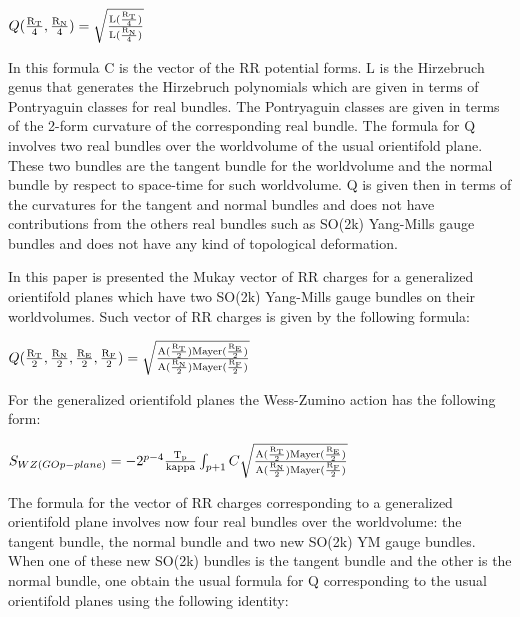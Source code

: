 \documentclass[a4paper,a4paper]{article}
\begin{document}
\begin{center}
{  $ Q(\frac{\rm R_T}{\rm 4},\frac{\rm R_N}{\rm 4}) =\sqrt{\frac{\rm L(\frac{\rm R_T}{\rm 4})}{\rm L(\frac{\rm R_N}{\rm 4})}}  $ }
\end{center}
In this formula C is the vector of the RR potential forms. L is the Hirzebruch genus that generates the Hirzebruch polynomials which are given in
terms of Pontryaguin classes for real bundles. The Pontryaguin classes are given in terms of the 2-form curvature of the corresponding real bundle. The
formula for Q involves two real bundles over the worldvolume of the usual orientifold plane.  These two bundles are the tangent bundle for the worldvolume and the normal bundle by respect to space-time for such worldvolume. Q is given then in terms of the curvatures for the tangent and
normal bundles and does not have contributions  from the others real bundles
such as SO(2k) Yang-Mills gauge bundles and does not have any kind of topological deformation.

In this paper is presented the Mukay vector of RR charges for a generalized
orientifold planes which have two SO(2k) Yang-Mills gauge bundles on their worldvolumes.  Such vector of RR charges is given by the following formula:

\begin{center}
{  $ Q(\frac{\rm R_T}{\rm 2},\frac{\rm R_N}{\rm 2},\frac{\rm R_E}{\rm 2},\frac{\rm R_F}{\rm 2}) =\sqrt{\frac{\rm A(\frac{\rm R_T}{\rm 2})Mayer(\frac{\rm R_E}{\rm 2})}{\rm A(\frac{\rm R_N}{\rm 2})Mayer(\frac{\rm R_F}{\rm 2})}} $ }
\end{center}

For the generalized  orientifold planes the Wess-Zumino action has the following form:

\begin{center}
{  $ S_{WZ(GOp-plane)} = -2^{p-4}\frac{\rm T_p}{\rm kappa}\int_{p+1} C\sqrt{\frac{\rm A(\frac{\rm R_T}{\rm 2})Mayer(\frac{\rm R_E}{\rm 2})}{\rm A(\frac{\rm R_N}{\rm 2})Mayer(\frac{\rm R_F}{\rm 2})}}$ }
\end{center}

The formula for the vector of RR charges corresponding to a generalized orientifold plane involves now four real bundles over the worldvolume: the 
tangent bundle, the normal bundle and two new SO(2k) YM gauge bundles.
When one of these new SO(2k) bundles is the tangent bundle and the other is the normal bundle, one obtain the usual formula for Q corresponding to the usual orientifold planes using the following identity:
\end{document}
